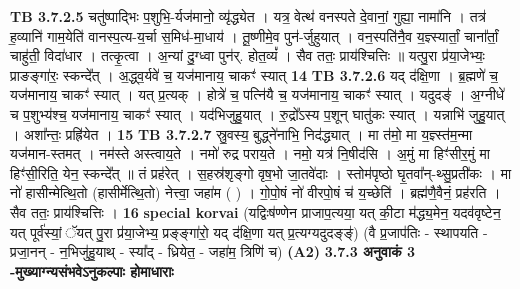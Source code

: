 \documentclass[17pt]{extarticle}
\begin{document}
{{{{{{{{{{{{{{{{{{{                  \newline
                                \textbf{ TB 3.7.2.5} \newline
                  चतु॑ष्पाद्भिः प॒शुभि॒-र्यज॑मानो॒ व्यृ॑द्ध्येत । यत्र॒ वेत्थ॑ वनस्पते दे॒वानां॒ गुह्या॒ नामा॑नि । तत्र॑ ह॒व्यानि॑ गाम॒येति॑ वानस्प॒त्य-य॒र्चा स॒मिध॑-मा॒धाय॑ । तू॒ष्णीमे॒व पुन॑-र्जुहुयात् । वन॒स्पति॑नै॒व य॒ज्ञ्स्यार्तां॒ चाना᳚र्तां॒ चाहु॑ती॒ विदा॑धार । तत्कृ॒त्वा । अ॒न्यां दु॒ग्ध्वा पुन॑र्. होत॒व्यं᳚ । सैव ततः॒ प्राय॑श्चित्तिः ॥ यत्पु॒रा प्र॑या॒जेभ्यः॒ प्राङङ्गा॑रः॒ स्कन्दे᳚त् । अ॒द्ध्व॒र्यवे॑ च॒ यज॑मानाय॒ चाकꣳ॑ स्यात् \textbf{ 14} \newline
                  \newline
                                \textbf{ TB 3.7.2.6} \newline
                  यद् द॑क्षि॒णा । ब्र॒ह्मणे॑ च॒ यज॑मानाय॒ चाकꣳ॑ स्यात् । यत् प्र॒त्यक् । होत्रे॑ च॒ पत्नि॑यै च॒ यज॑मानाय॒ चाकꣳ॑ स्यात् । यदुदङ्॑ । अ॒ग्नीधे॑ च प॒शुभ्य॑श्च॒ यज॑मानाय॒ चाकꣳ॑ स्यात् । यद॑भिजुहु॒यात् । रु॒द्रो᳚ऽस्य प॒शून् घातु॑कः स्यात् । यन्नाभि॑ जुहु॒यात् । अशा᳚न्तः॒ प्रह्रि॑येत । \textbf{ 15} \newline
                  \newline
                                \textbf{ TB 3.7.2.7} \newline
                  स्रु॒वस्य॒ बुद्ध्ने॑नाभि॒ निद॑द्ध्यात् । मा त॑मो॒ मा य॒ज्ञ्स्त॑म॒न्मा यज॑मान-स्तमत् । नम॑स्ते अस्त्वाय॒ते । नमो॑ रुद्र पराय॒ते । नमो॒ यत्र॑ नि॒षीद॑सि । अ॒मुं मा हिꣳ॑सीर॒मुं मा हिꣳ॑सी॒रिति॒ येन॒ स्कन्दे᳚त् ॥ तं प्रह॑रेत् । स॒हस्र॑शृङ्गो वृष॒भो जा॒तवे॑दाः । स्तोम॑पृष्ठो घृ॒तवा᳚न्-थ्सु॒प्रती॑कः । मा नो॑ हासीन्मेत्थि॒तो (हासीर्मेत्थि॒तो) नेत्त्वा॒ जहा॑म ( ) । गो॒पो॒षं नो॑ वीरपो॒षं च॑ य॒च्छेति॑ । ब्रह्म॑णै॒वैनं॒ प्रह॑रति । सैव ततः॒ प्राय॑श्चित्तिः । \textbf{ 16} \newline
                  \newline
                                                        \textbf{special korvai} \newline
              (यद्विःष॑ण्णेन प्राजाप॒त्यया॒ यत् की॒टा म॑द्ध्य॒मेन॒ यदव॑वृष्टेन॒ यत् पूर्व॑स्यां॒ ॅयत् पु॒रा प्र॑या॒जेभ्य॒ प्रङ्ङ्गा॑रो॒ यद् द॑क्षि॒णा यत् प्र॒त्यग्यदुदङ्ङ्॑) \newline
                                (वै प्र॒जाप॑तिः - स्थापयति - प्रजा॒नन् - न॒भिजु॑हु॒याथ् - स्या᳚द् - ध्रियेत॒ - जहा॑म॒ त्रिणि॑ च) \textbf{(A2)} \newline \newline
                \textbf{ 3.7.3     अनुवाकं   3 -मुख्याग्न्यसंभवेऽनुकल्पाः होमाधाराः} \newline
}}}}}}}}}}}}}}}}}}}
\end{document}

